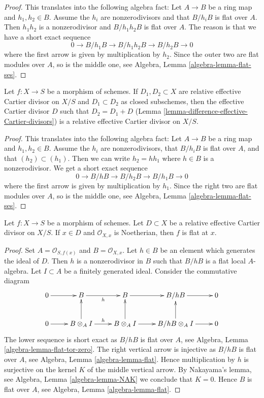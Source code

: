 \begin{proof}
This translates into the following algebra fact:
Let $A \to B$ be a ring map and $h_1, h_2 \in B$.
Assume the $h_i$ are nonzerodivisors and that $B/h_iB$ is flat over $A$.
Then $h_1h_2$ is a nonzerodivisor and $B/h_1h_2B$ is flat over $A$.
The reason is that we have a short exact sequence
$$
0 \to B/h_1B \to B/h_1h_2B \to B/h_2B \to 0
$$
where the first arrow is given by multiplication by $h_2$. Since
the outer two are flat modules over $A$, so is the middle one, see
Algebra, Lemma \ref{algebra-lemma-flat-ses}.
\end{proof}

\begin{lemma}
\label{lemma-difference-relative-effective-Cartier-divisor}
Let $f : X \to S$ be a morphism of schemes. If $D_1, D_2 \subset X$
are relative effective Cartier divisor on $X/S$ and $D_1 \subset D_2$
as closed subschemes, then the effective Cartier divisor $D$
such that $D_2 = D_1 + D$
(Lemma \ref{lemma-difference-effective-Cartier-divisors}) is
a relative effective Cartier divisor on $X/S$.
\end{lemma}

\begin{proof}
This translates into the following algebra fact:
Let $A \to B$ be a ring map and $h_1, h_2 \in B$.
Assume the $h_i$ are nonzerodivisors, that $B/h_iB$ is flat over $A$, and
that $(h_2) \subset (h_1)$. Then we can write $h_2 = h h_1$
where $h \in B$ is a nonzerodivisor. We get a short exact sequence
$$
0 \to B/hB \to B/h_2B \to B/h_1B \to 0
$$
where the first arrow is given by multiplication by $h_1$. Since
the right two are flat modules over $A$, so is the middle one, see
Algebra, Lemma \ref{algebra-lemma-flat-ses}.
\end{proof}

\begin{lemma}
\label{lemma-flat-at-x}
Let $f : X \to S$ be a morphism of schemes.
Let $D \subset X$ be a relative effective Cartier divisor on $X/S$.
If $x \in D$ and $\mathcal{O}_{X, x}$ is Noetherian, then $f$ is flat at $x$.
\end{lemma}

\begin{proof}
Set $A = \mathcal{O}_{S, f(x)}$ and $B = \mathcal{O}_{X, x}$.
Let $h \in B$ be an element which generates the ideal of $D$.
Then $h$ is a nonzerodivisor in $B$ such that $B/hB$ is a flat
local $A$-algebra. Let $I \subset A$ be a finitely generated ideal.
Consider the commutative diagram
$$
\xymatrix{
0 \ar[r] &
B \ar[r]_h &
B \ar[r] &
B/hB \ar[r] & 0 \\
0 \ar[r] &
B \otimes_A I \ar[r]^h \ar[u] &
B \otimes_A I \ar[r] \ar[u] &
B/hB \otimes_A I \ar[r] \ar[u] & 0
}
$$
The lower sequence is short exact as $B/hB$ is flat over $A$, see
Algebra, Lemma \ref{algebra-lemma-flat-tor-zero}.
The right vertical arrow is injective as $B/hB$ is flat over $A$, see
Algebra, Lemma \ref{algebra-lemma-flat}.
Hence multiplication by $h$ is surjective on the kernel $K$ of
the middle vertical arrow. By Nakayama's lemma, see
Algebra, Lemma \ref{algebra-lemma-NAK}
we conclude that $K= 0$. Hence $B$ is flat over $A$, see
Algebra, Lemma \ref{algebra-lemma-flat}.
\end{proof}

